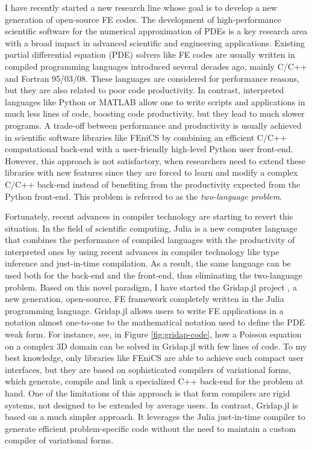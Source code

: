 \documentclass{article}
\begin{document}
I have recently started a new research line whose goal is to develop a new generation of open-source FE codes.  The development of high-performance scientific software for the numerical approximation of PDEs is a key research area with a broad impact in advanced scientific and engineering applications. Existing partial differential equation (PDE) solvers like FE codes are usually written in compiled programming languages introduced several decades ago, mainly C/C++ and Fortran 95/03/08. These languages are considered for performance reasons, but they are also related to poor code productivity. In contrast, interpreted languages like Python or MATLAB allow one to write scripts and applications in much less lines of code, boosting code productivity, but they lead to much slower programs. A trade-off between performance and productivity is usually achieved in scientific software libraries like FEniCS by combining an efficient C/C++ computational back-end with a user-friendly high-level Python user front-end. However, this approach is not satisfactory, when researchers need to extend these libraries with new features since they are forced to learn and modify a complex C/C++ back-end instead of benefiting from the productivity expected from the Python front-end. This problem is referred to as the \emph{two-language problem}.

Fortunately, recent advances in compiler technology are starting to revert this situation. In the field of scientific computing, Julia is a new computer language that combines the performance of compiled languages with the productivity of interpreted ones by using recent advances in compiler technology like type inference and just-in-time compilation. As a result, the same language can be used both for the back-end and the front-end, thus eliminating the two-language problem. Based on this novel paradigm, I have started the Gridap.jl project \cite{badia_2020b}, a new generation, open-source, FE framework completely written in the Julia programming language. Gridap.jl allows users to write FE applications in a notation almost one-to-one to the mathematical notation used to define the PDE weak form. For instance, see, in Figure \ref{fig:gridap-code}, how a Poisson equation on a complex 3D domain can be solved in Gridap.jl with few lines of code. To my best knowledge, only libraries like FEniCS are able to achieve such compact user interfaces, but they are based on sophisticated compilers of variational forms, which generate, compile and link a specialized C++ back-end for the problem at hand. One of the limitations of this approach is that form compilers are rigid systems, not designed to be extended by average users. In contrast, Gridap.jl is based on a much simpler approach. It leverages the Julia just-in-time compiler to generate efficient problem-specific code without the need to maintain a custom compiler of variational forms.
\end{document}
